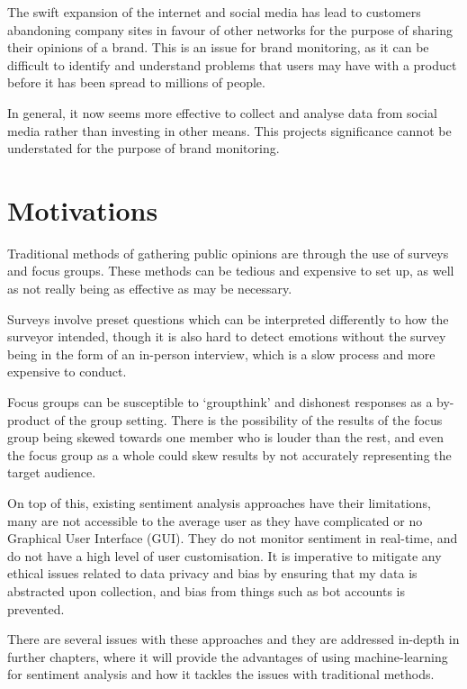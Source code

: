 The swift expansion of the internet and social media has lead to customers abandoning company sites in favour of other networks for the purpose of sharing their opinions of a brand. This is an issue for brand monitoring, as it can be difficult to identify and understand problems that users may have with a product before it has been spread to millions of people.

In general, it now seems more effective to collect and analyse data from social media rather than investing in other means. This projects significance cannot be understated for the purpose of brand monitoring.

\section{Motivations}
Traditional methods of gathering public opinions are through the use of surveys and focus groups. These methods can be tedious and expensive to set up, as well as not really being as effective as may be necessary.

Surveys involve preset questions which can be interpreted differently to how the surveyor intended, though it is also hard to detect emotions without the survey being in the form of an in-person interview, which is a slow process and more expensive to conduct. 

Focus groups can be susceptible to `groupthink' and dishonest responses as a by-product of the group setting. There is the possibility of the results of the focus group being skewed towards one member who is louder than the rest, and even the focus group as a whole could skew results by not accurately representing the target audience.

On top of this, existing sentiment analysis approaches have their limitations, many are not accessible to the average user as they have complicated or no Graphical User Interface (GUI). They do not monitor sentiment in real-time, and do not have a high level of user customisation. It is imperative to mitigate any ethical issues related to data privacy and bias by ensuring that my data is abstracted upon collection, and bias from things such as bot accounts is prevented.

There are several issues with these approaches and they are addressed in-depth in further chapters, where it will provide the advantages of using machine-learning for sentiment analysis and how it tackles the issues with traditional methods.

